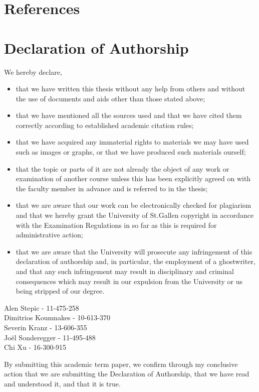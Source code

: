 \documentclass[a4paper,12pt]{article}
\begin{document}
\section{References}
\printbibliography[heading=none]
\clearpage

\section{Declaration of Authorship}
We hereby declare,

\begin{itemize}
	\item that we have written this thesis without any help from others and without the use of documents and aids other than those stated above;
	\item that we have mentioned all the sources used and that we have cited them correctly according to established academic citation rules;
    \item that we have acquired any immaterial rights to materials we may have used such as images or graphs, or that we have produced such materials ourself;
    \item that the topic or parts of it are not already the object of any work or examination of another course unless this has been explicitly agreed on with the faculty member in advance and is referred to in the thesis;
    \item that we are aware that our work can be electronically checked for plagiarism and that we hereby grant the University of St.Gallen copyright in accordance with the Examination Regulations in so far as this is required for administrative action;
    \item that we are aware that the University will prosecute any infringement of this declaration of authorship and, in particular, the employment of a ghostwriter, and that any such infringement may result in disciplinary and criminal consequences which may result in our expulsion from the University or us being stripped of our degree.
\end{itemize}

\begin{flushleft}
Alen Stepic - 11-475-258\\\bigskip\bigskip  
Dimitrios Koumnakes - 10-613-370\\\bigskip\bigskip
Severin Kranz - 13-606-355\\\bigskip\bigskip
Joël Sonderegger - 11-495-488\\\bigskip\bigskip
Chi Xu - 16-300-915

By submitting this academic term paper, we confirm through my conclusive action that we are submitting the Declaration of Authorship, that we have read and understood it, and that it is true.

\end{flushleft}
\clearpage

\end{document}
